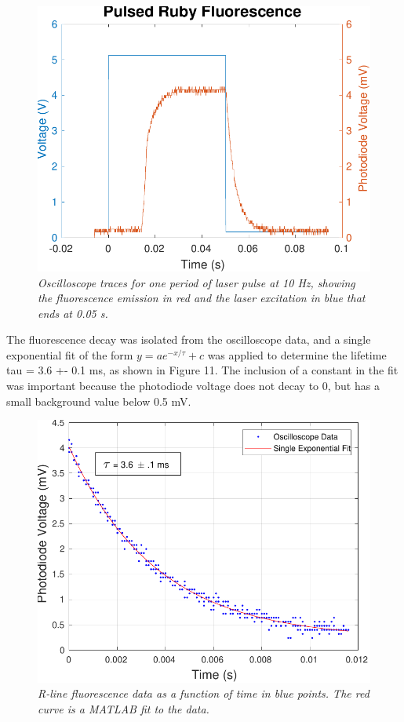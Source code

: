 \documentclass[11pt, a4paper, twocolumn]{article}
\begin{document}
\begin{figure}[]
\includegraphics[width=\linewidth]{fluorescencePeriod.pdf}
\caption{\textit{Oscilloscope traces for one period of laser pulse at 10 Hz, showing the fluorescence emission in red and the laser excitation in blue that ends at 0.05 s.}}
\label{fig:fluorescencePeriod}
\end{figure}

The fluorescence decay was isolated from the oscilloscope data, and a single exponential fit of the form $y = ae^{-x/\tau} + c$ was applied to determine the  lifetime tau = 3.6 +- 0.1 ms, as shown in Figure 11. The inclusion of a constant in the fit was important because the photodiode voltage does not decay to 0, but has a small background value below 0.5 mV.

\begin{figure}[]
\includegraphics[width=\linewidth]{decayFit.pdf}
\caption{\textit{R-line fluorescence data as a function of time in blue points. The red curve is a MATLAB fit to the data.}
}
\label{fig:populationInversion}
\end{figure}
\end{document}
